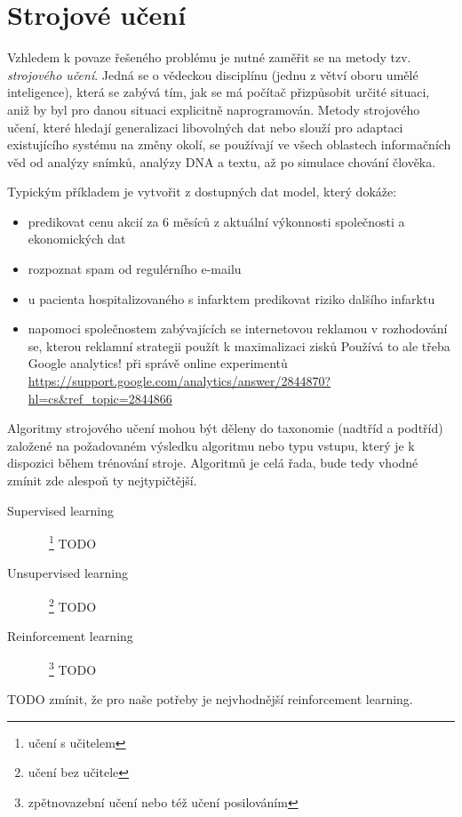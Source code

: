 \documentclass[thesis=M,czech]{FITthesis}[2014/05/07]
\begin{document}
\section{Strojové učení}

Vzhledem k povaze řešeného problému je nutné zaměřit se na metody tzv. \emph{strojového učení}. 
Jedná se o vědeckou disciplínu (jednu z větví oboru umělé inteligence), která se zabývá tím, jak se má počítač přizpůsobit určité situaci, aniž by byl pro danou situaci explicitně naprogramován. Metody strojového učení, které hledají generalizaci libovolných dat nebo slouží pro adaptaci existujícího systému na změny okolí, se používají ve všech oblastech informačních věd od analýzy snímků, analýzy DNA a textu, až po simulace chování člověka. 

Typickým příkladem je vytvořit z dostupných dat model, který dokáže:

\begin{itemize}
  \item predikovat cenu akcií za 6 měsíců z aktuální výkonnosti společnosti a ekonomických dat
  \item rozpoznat spam od regulérního e-mailu
  \item u pacienta hospitalizovaného s infarktem predikovat riziko dalšího infarktu
  \item napomoci společnostem zabývajících se internetovou reklamou v rozhodování se, kterou reklamní strategii použít k maximalizaci zisků
  Používá to ale třeba Google analytics! při správě online experimentů
\url{https://support.google.com/analytics/answer/2844870?hl=cs&ref_topic=2844866}
\end{itemize}

Algoritmy strojového učení mohou být děleny do taxonomie (nadtříd a podtříd) založené na požadovaném výsledku algoritmu nebo typu vstupu, který je k dispozici během trénování stroje. Algoritmů je celá řada, bude tedy vhodné zmínit zde alespoň ty nejtypičtější. 

\begin{description}
  \item[Supervised learning]~\footnote{učení s učitelem} TODO
  \item[Unsupervised learning]~\footnote{učení bez učitele} TODO
  \item[Reinforcement learning]~\footnote{zpětnovazební učení nebo též učení posilováním} TODO
\end{description}

TODO zmínit, že pro naše potřeby je nejvhodnější reinforcement learning.
\end{document}
